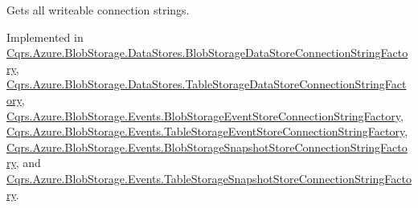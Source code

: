 Gets all writeable connection strings. 



Implemented in \hyperlink{classCqrs_1_1Azure_1_1BlobStorage_1_1DataStores_1_1BlobStorageDataStoreConnectionStringFactory_a71b549351646fd4261b3f52f264759f4_a71b549351646fd4261b3f52f264759f4}{Cqrs.\+Azure.\+Blob\+Storage.\+Data\+Stores.\+Blob\+Storage\+Data\+Store\+Connection\+String\+Factory}, \hyperlink{classCqrs_1_1Azure_1_1BlobStorage_1_1DataStores_1_1TableStorageDataStoreConnectionStringFactory_a65b6f404ac2434c6366af73a22e914d1_a65b6f404ac2434c6366af73a22e914d1}{Cqrs.\+Azure.\+Blob\+Storage.\+Data\+Stores.\+Table\+Storage\+Data\+Store\+Connection\+String\+Factory}, \hyperlink{classCqrs_1_1Azure_1_1BlobStorage_1_1Events_1_1BlobStorageEventStoreConnectionStringFactory_a002b45d6a893b1b3024b0e7c97f1c9ac_a002b45d6a893b1b3024b0e7c97f1c9ac}{Cqrs.\+Azure.\+Blob\+Storage.\+Events.\+Blob\+Storage\+Event\+Store\+Connection\+String\+Factory}, \hyperlink{classCqrs_1_1Azure_1_1BlobStorage_1_1Events_1_1TableStorageEventStoreConnectionStringFactory_a07406c2607bdd42dd13116b92fc6b665_a07406c2607bdd42dd13116b92fc6b665}{Cqrs.\+Azure.\+Blob\+Storage.\+Events.\+Table\+Storage\+Event\+Store\+Connection\+String\+Factory}, \hyperlink{classCqrs_1_1Azure_1_1BlobStorage_1_1Events_1_1BlobStorageSnapshotStoreConnectionStringFactory_a3b0a626033bedf1dc33951266ac656e4_a3b0a626033bedf1dc33951266ac656e4}{Cqrs.\+Azure.\+Blob\+Storage.\+Events.\+Blob\+Storage\+Snapshot\+Store\+Connection\+String\+Factory}, and \hyperlink{classCqrs_1_1Azure_1_1BlobStorage_1_1Events_1_1TableStorageSnapshotStoreConnectionStringFactory_a78f9987855e2c4c370c624b0edb97f4d_a78f9987855e2c4c370c624b0edb97f4d}{Cqrs.\+Azure.\+Blob\+Storage.\+Events.\+Table\+Storage\+Snapshot\+Store\+Connection\+String\+Factory}.

